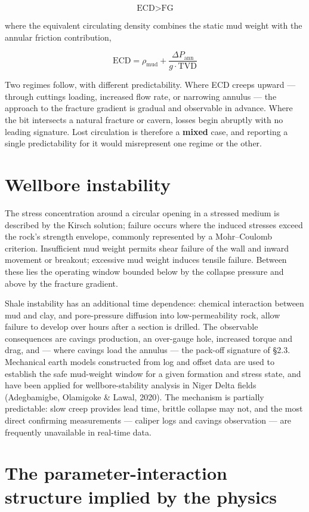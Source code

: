 \documentclass[12pt,a4paper]{report}
\begin{document}
\[\text{ECD} > \text{FG}\]

where the equivalent circulating density combines the static mud weight with the annular friction
contribution,

\[\text{ECD} = \rho_{\text{mud}} + \frac{\Delta P_{\text{ann}}}{g \cdot \text{TVD}}\]

Two regimes follow, with different predictability. Where ECD creeps upward --- through cuttings loading,
increased flow rate, or narrowing annulus --- the approach to the fracture gradient is gradual and
observable in advance. Where the bit intersects a natural fracture or cavern, losses begin abruptly with
no leading signature. Lost circulation is therefore a \textbf{mixed} case, and reporting a single
predictability for it would misrepresent one regime or the other.

\section{Wellbore instability}

The stress concentration around a circular opening in a stressed medium is described by the Kirsch
solution; failure occurs where the induced stresses exceed the rock's strength envelope, commonly
represented by a Mohr--Coulomb criterion. Insufficient mud weight permits shear failure of the wall and
inward movement or breakout; excessive mud weight induces tensile failure. Between these lies the
operating window bounded below by the collapse pressure and above by the fracture gradient.

Shale instability has an additional time dependence: chemical interaction between mud and clay, and
pore-pressure diffusion into low-permeability rock, allow failure to develop over hours after a section is
drilled. The observable consequences are cavings production, an over-gauge hole, increased torque and
drag, and --- where cavings load the annulus --- the pack-off signature of §2.3. Mechanical earth models
constructed from log and offset data are used to establish the safe mud-weight window for a given
formation and stress state, and have been applied for wellbore-stability analysis in Niger Delta fields
(Adegbamigbe, Olamigoke \& Lawal, 2020). The mechanism is partially predictable: slow creep provides lead
time, brittle collapse may not, and the most direct confirming measurements --- caliper logs and cavings
observation --- are frequently unavailable in real-time data.

\section{The parameter-interaction structure implied by the physics}
\end{document}
